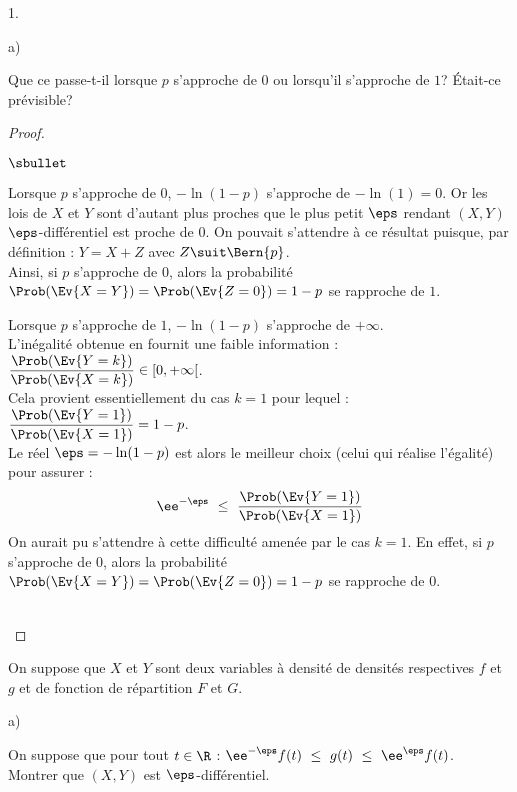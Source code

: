 \documentclass[11pt]{article}%
\begin{document}
\begin{noliste}{1.}
\begin{noliste}{a)}
  \item Que ce passe-t-il lorsque $p$ s'approche de $0$ ou lorsqu'il
    s'approche de $1$? Était-ce prévisible?

    \begin{proof}~%
      \begin{noliste}{$\sbullet$}
      \item Lorsque $p$ s'approche de $0$, $-\ln(1-p)$ s'approche de
        $-\ln(1) = 0$. Or les lois de $X$ et $Y$ sont d'autant plus
        proches que le plus petit $\eps$ rendant $(X, Y)$
        $\eps$-différentiel est proche de $0$.%
        On pouvait s'attendre à ce résultat puisque, par définition :
        $Y = X + Z$ avec $Z \suit \Bern{p}$.\\
        Ainsi, si $p$ s'approche de $0$, alors la probabilité
        $\Prob(\Ev{X = Y}) = \Prob(\Ev{Z = 0}) = 1-p$ se rapproche de 
$1$.

      \item Lorsque $p$ s'approche de $1$, $-\ln(1-p)$ s'approche de
        $+\infty$.\\
        L'inégalité obtenue en  fournit une faible
        information : $\dfrac{\Prob(\Ev{Y= k})}{\Prob(\Ev{X = k})}
        \in [0, +\infty[$.\\[.2cm]
        Cela provient essentiellement du cas $k = 1$ pour lequel :
        $\dfrac{\Prob(\Ev{Y= 1})}{\Prob(\Ev{X = 1})} = 1 - p$.\\
        Le réel $\eps = -\ln(1-p)$ est alors le meilleur choix (celui
        qui réalise l'égalité) pour assurer :
        \[
        \ee^{-\eps} \ \leq \ \dfrac{\Prob(\Ev{Y= 1})}{\Prob(\Ev{X =
            1})}
        \]
        On aurait pu s'attendre à cette difficulté amenée par le cas
        $k = 1$. En effet, si $p$ s'approche de $0$, alors la
        probabilité $\Prob(\Ev{X = Y}) = \Prob(\Ev{Z = 0}) = 1-p$ se
        rapproche de $0$.
      \end{noliste}~\\[-1cm]
    \end{proof}
  \end{noliste}
  
\item On suppose que $X$ et $Y$ sont deux variables à densité de
  densités respectives $f$ et $g$ et de fonction de répartition $F$ et
  $G$.
  \begin{noliste}{a)}
    \setlength{\itemsep}{2mm} %
  \item On suppose que pour tout $t\in\R$ : $\ee^{-\eps} f(t) \ \leq \
    g(t) \ \leq \ \ee^{\eps}f(t)$.\\
    Montrer que $(X,Y)$ est $\eps$-différentiel.


\end{noliste}
\end{noliste}
\end{document}
